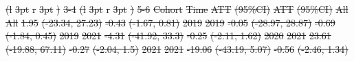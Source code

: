 \documentclass[
  letterpaper,
  DIV=11,
  numbers=noendperiod]{scrartcl}
\providecommand{\DIFdel}[1]{{\protect\color{red}\sout{#1}}}                      %
\providecommand{\DIFdelFL}[1]{\DIFdel{#1}} %
\providecommand{\DIFdelbeginFL}{} %
\newcommand{\DIFscaledelfig}{0.5}
\newlength{\DIFdelgraphicswidth} %
\newlength{\DIFdelgraphicsheight} %
\newcommand{\DIFdelincludegraphics}[2][]{%
\sbox{\DIFdelgraphicsbox}{\DIFOincludegraphics[#1]{#2}}%
\settoboxwidth{\DIFdelgraphicswidth}{\DIFdelgraphicsbox} %
\settoboxtotalheight{\DIFdelgraphicsheight}{\DIFdelgraphicsbox} %
\scalebox{\DIFscaledelfig}{%
\parbox[b]{\DIFdelgraphicswidth}{\usebox{\DIFdelgraphicsbox}\\[-\baselineskip] \rule{\DIFdelgraphicswidth}{0em}}\llap{\resizebox{\DIFdelgraphicswidth}{\DIFdelgraphicsheight}{%
\setlength{\unitlength}{\DIFdelgraphicswidth}%
\begin{picture}(1,1)%
\thicklines\linethickness{2pt} %
{\color[rgb]{1,0,0}\put(0,0){\framebox(1,1){}}}%
{\color[rgb]{1,0,0}\put(0,0){\line( 1,1){1}}}%
{\color[rgb]{1,0,0}\put(0,1){\line(1,-1){1}}}%
\end{picture}%
}\hspace*{3pt}}} %
} %
\DeclareRobustCommand{\DIFdelbeginFL}{\DIFOdelbeginFL \let\includegraphics\DIFdelincludegraphics} %
\begin{document}
\DIFdelbeginFL %
\DIFdelFL{(l}%
\DIFdelFL{3pt}%
\DIFdelFL{r}%
\DIFdelFL{3pt}%
\DIFdelFL{)}%
\DIFdelFL{3-4}%
\DIFdelFL{(l}%
\DIFdelFL{3pt}%
\DIFdelFL{r}%
\DIFdelFL{3pt}%
\DIFdelFL{)}%
\DIFdelFL{5-6}%
\DIFdelFL{Cohort }%
\DIFdelFL{Time }%
\DIFdelFL{ATT }%
\DIFdelFL{(95\%CI) }%
\DIFdelFL{ATT }%
\DIFdelFL{(95\%CI)}%
\DIFdelFL{All }%
\DIFdelFL{All }%
\DIFdelFL{1.95 }%
\DIFdelFL{(-23.34, 27.23) }%
\DIFdelFL{-0.43 }%
\DIFdelFL{(-1.67, 0.81)}%
\DIFdelFL{2019 }%
\DIFdelFL{2019 }%
\DIFdelFL{-0.05 }%
\DIFdelFL{(-28.97, 28.87) }%
\DIFdelFL{-0.69 }%
\DIFdelFL{(-1.84, 0.45)}%
\DIFdelFL{2019 }%
\DIFdelFL{2021 }%
\DIFdelFL{-4.31 }%
\DIFdelFL{(-41.92, 33.3) }%
\DIFdelFL{-0.25 }%
\DIFdelFL{(-2.11, 1.62)}%
\DIFdelFL{2020 }%
\DIFdelFL{2021 }%
\DIFdelFL{23.61 }%
\DIFdelFL{(-19.88, 67.11) }%
\DIFdelFL{-0.27 }%
\DIFdelFL{(-2.04, 1.5)}%
\DIFdelFL{2021 }%
\DIFdelFL{2021 }%
\DIFdelFL{-19.06 }%
\DIFdelFL{(-43.19, 5.07) }%
\DIFdelFL{-0.56 }%
\DIFdelFL{(-2.46, 1.34)}%
\end{document}
